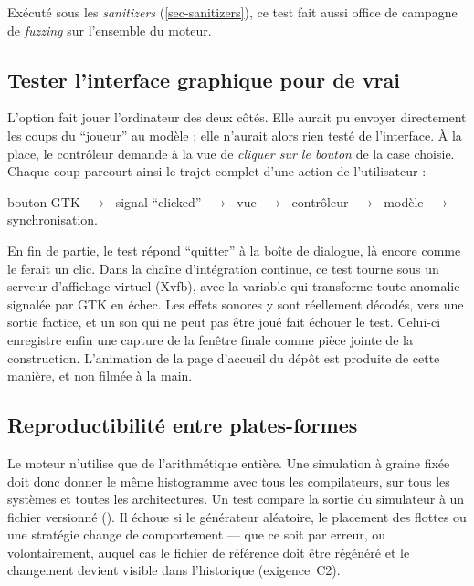 Exécuté sous les \emph{sanitizers} (\cref{sec-sanitizers}), ce test fait aussi office de
campagne de \emph{fuzzing} sur l'ensemble du moteur.

\subsection{Tester l'interface graphique pour de vrai}

L'option  fait jouer l'ordinateur des deux côtés. Elle aurait pu envoyer
directement les coups du \enquote{joueur} au modèle ; elle n'aurait alors rien testé de
l'interface. À la place, le contrôleur demande à la vue de \emph{cliquer sur le bouton} de
la case choisie. Chaque coup parcourt ainsi le trajet complet d'une action de
l'utilisateur :

\begin{center}
  bouton GTK $\;\rightarrow\;$ signal \enquote{clicked} $\;\rightarrow\;$ vue
  $\;\rightarrow\;$ contrôleur $\;\rightarrow\;$ modèle $\;\rightarrow\;$ synchronisation.
\end{center}

En fin de partie, le test répond \enquote{quitter} à la boîte de dialogue, là encore comme
le ferait un clic. Dans la chaîne d'intégration continue, ce test tourne sous un serveur
d'affichage virtuel (Xvfb), avec la variable  qui transforme
toute anomalie signalée par GTK en échec. Les effets sonores y sont réellement décodés, vers
une sortie factice, et un son qui ne peut pas être joué fait échouer le test. Celui-ci
enregistre enfin une capture de la fenêtre finale comme pièce jointe de la construction. L'animation de la page d'accueil du dépôt est
produite de cette manière, et non filmée à la main.

\subsection{Reproductibilité entre plates-formes}

Le moteur n'utilise que de l'arithmétique entière. Une simulation à graine fixée doit donc
donner le même histogramme avec tous les compilateurs, sur tous les systèmes et toutes les
architectures. Un test compare la sortie du simulateur à un fichier versionné
(). Il échoue si le générateur aléatoire, le
placement des flottes ou une stratégie change de comportement --- que ce soit par erreur, ou
volontairement, auquel cas le fichier de référence doit être régénéré et le changement
devient visible dans l'historique (exigence~C2).

